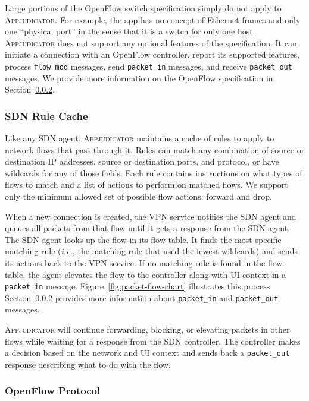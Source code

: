 Large portions of the OpenFlow switch specification simply do not apply to
\textsc{Appjudicator}. For example, the app has no concept of Ethernet frames
and only one ``physical port'' in the sense that it is a switch for only one
host. \textsc{Appjudicator} does not support any optional features of the
specification. It can initiate a connection with an OpenFlow controller, report
its supported features, process \texttt{flow\_mod} messages, send
\texttt{packet\_in} messages, and receive \texttt{packet\_out} messages. We
provide more information on the OpenFlow specification in
Section~\ref{sec:openflow-protocol}.

\subsubsection{SDN Rule Cache}
\label{sec:implementation-sdn-rule-cache}

Like any SDN agent, \textsc{Appjudicator} maintains a cache of rules to apply to
network flows that pass through it. Rules can match any combination of source or
destination IP addresses, source or destination ports, and protocol, or have
wildcards for any of those fields. Each rule contains instructions on what types
of flows to match and a list of actions to perform on matched flows. We support
only the minimum allowed set of possible flow actions: forward and drop.

When a new connection is created, the VPN service notifies the SDN agent and
queues all packets from that flow until it gets a response from the SDN agent.
The SDN agent looks up the flow in its flow table. It finds the most specific
matching rule (\textit{i.e.}, the matching rule that used the fewest wildcards)
and sends its actions back to the VPN service. If no matching rule is found in
the flow table, the agent elevates the flow to the controller along with UI
context in a \texttt{packet\_in} message.  Figure~\ref{fig:packet-flow-chart}
illustrates this process.  Section~\ref{sec:openflow-protocol} provides more
information about \texttt{packet\_in} and \texttt{packet\_out} messages.

\textsc{Appjudicator} will continue forwarding, blocking, or elevating packets
in other flows while waiting for a response from the SDN controller. The
controller makes a decision based on the network and UI context and sends back a
\texttt{packet\_out} response describing what to do with the flow.

\subsubsection{OpenFlow Protocol}
\label{sec:openflow-protocol}

